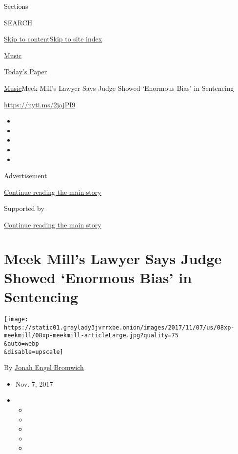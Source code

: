 Sections

SEARCH

\protect\hyperlink{site-content}{Skip to
content}\protect\hyperlink{site-index}{Skip to site index}

\href{https://www.nytimes3xbfgragh.onion/section/arts/music}{Music}

\href{https://myaccount.nytimes3xbfgragh.onion/auth/login?response_type=cookie\&client_id=vi}{}

\href{https://www.nytimes3xbfgragh.onion/section/todayspaper}{Today's
Paper}

\href{/section/arts/music}{Music}\textbar{}Meek Mill's Lawyer Says Judge
Showed `Enormous Bias' in Sentencing

\url{https://nyti.ms/2jajPI9}

\begin{itemize}
\item
\item
\item
\item
\item
\end{itemize}

Advertisement

\protect\hyperlink{after-top}{Continue reading the main story}

Supported by

\protect\hyperlink{after-sponsor}{Continue reading the main story}

\hypertarget{meek-mills-lawyer-says-judge-showed-enormous-bias-in-sentencing}{%
\section{Meek Mill's Lawyer Says Judge Showed `Enormous Bias' in
Sentencing}\label{meek-mills-lawyer-says-judge-showed-enormous-bias-in-sentencing}}

\texttt{[image: https://static01.graylady3jvrrxbe.onion/images/2017/11/07/us/08xp-meekmill/08xp-meekmill-articleLarge.jpg?quality=75\\\&auto=webp\\\&disable=upscale]}

By
\href{http://www.nytimes3xbfgragh.onion/by/jonah-engel-bromwich}{Jonah
Engel Bromwich}

\begin{itemize}
\item
  Nov. 7, 2017
\item
  \begin{itemize}
  \item
  \item
  \item
  \item
  \item
  \end{itemize}
\end{itemize}

